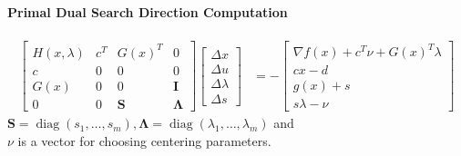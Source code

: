 \documentclass[landscape,a4paper,8pt]{scrartcl}
\newcommand\vI{\bm{I}}
\newcommand\vS{\bm{S}}
\newcommand{\Me}[1]{\begin{bmatrix}#1\end{bmatrix}} %
\DeclareMathOperator\diag{diag}
\begin{document}
\begin{multicols*}{3}
\paragraph{Primal Dual Search Direction Computation}
\begin{align*}
\Me{H(x,\lambda) & c^T & G(x)^T & 0 \\ c & 0 & 0 & 0 \\ G(x) & 0 & 0 & \vI \\ 0 & 0 & \vS & \bm \Lambda}\Me{\Delta x \\ \Delta u \\ \Delta \lambda \\ \Delta s} & = - \Me{\nabla f(x) + c^T\nu + G(x)^T\lambda \\ cx - d \\ g(x) + s \\ s\lambda - \nu}
\end{align*}
$\vS = \diag(s_1, \dots, s_m), \bm \Lambda = \diag(\lambda_1, \dots, \lambda_m)$ and \\
$\nu$ is a vector for choosing centering parameters.


\end{multicols*}
\end{document}
